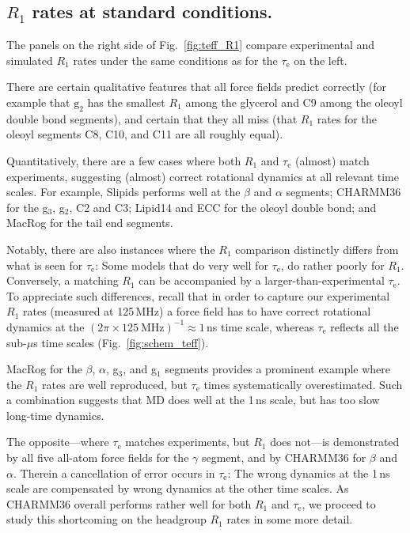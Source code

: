 \documentclass[journal=jpcbfk,manuscript=article,layout=twocolumn]{achemso}
\begin{document}
\subsection*{$R_1$ rates at standard conditions.}
The panels on the right side of Fig.~\ref{fig:teff_R1} compare experimental and simulated $R_{1}$ rates under the same conditions as for the $\tau_\mathrm{e}$ on the left.

There are certain qualitative features that all force fields predict correctly
(for example that $\mathrm g_2$ has the smallest $R_1$ among the glycerol and C9 among the oleoyl double bond segments),
and certain that they all miss (that $R_1$ rates for the oleoyl segments C8, C10, and C11 are all roughly equal).

Quantitatively,
there are a few cases where both $R_1$ and $\tau_\mathrm{e}$ (almost) match experiments, suggesting (almost) correct rotational dynamics at all relevant time scales.
%
%
For example, 
Slipids performs well at the $\beta$ and $\alpha$ segments;
CHARMM36 for the g$_3$, g$_2$,  C2 and C3;
Lipid14 and ECC for the oleoyl double bond; and
MacRog for the tail end segments.

Notably, there are also instances where the $R_1$ comparison distinctly differs from what is seen for $\tau_\mathrm{e}$: Some models that do very well for $\tau_\mathrm{e}$, do rather poorly for $R_1$. Conversely, a matching $R_{1}$ can be accompanied by a larger-than-experimental $\tau_\mathrm{e}$.
To appreciate such differences,  recall that in order to capture our experimental $R_1$ rates (measured at 125\,MHz) a force field has to have correct rotational dynamics at the $(2\pi\times125~\mathrm{MHz})^{-1}\approx1$\,ns time scale, whereas
$\tau_\mathrm{e}$ reflects all the sub-$\mu$s time scales (Fig.~\ref{fig:schem_teff}).

MacRog for the $\beta$, $\alpha$, g$_3$, and g$_1$ segments provides a prominent example where
the $R_1$ rates are well reproduced, but $\tau_\mathrm e$ times systematically overestimated.
Such a combination suggests that MD does well at the 1\,ns scale, but has too slow long-time dynamics.

The opposite---where $\tau_\mathrm{e}$ matches experiments, but $R_1$ does not---is demonstrated by all five all-atom force fields for the $\gamma$ segment,
and by CHARMM36 for $\beta$ and $\alpha$. Therein a cancellation of error occurs in $\tau_\mathrm{e}$: The wrong dynamics at the 1\,ns scale are compensated by wrong dynamics at the other time scales.
As CHARMM36 overall performs rather well for both $R_1$ and $\tau_\mathrm{e}$,
we proceed to study this shortcoming on the headgroup $R_1$ rates
in some more detail.
%
\end{document}
